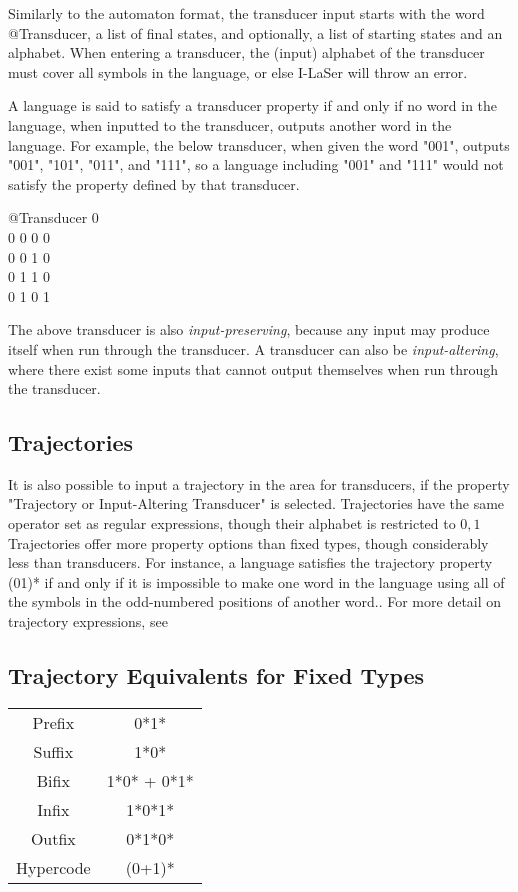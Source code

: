 \documentclass{article}
\begin{document}
Similarly to the automaton format, the transducer input starts with the word @Transducer, a list of final states, and optionally, a list of starting states and an alphabet.
When entering a transducer, the (input) alphabet of the transducer must cover all symbols in the language, or else I-LaSer will throw an error.

A language is said to satisfy a transducer property if and only if no word in the language, when inputted to the transducer, outputs another word in the language. 
For example, the below transducer, when given the word "001", outputs "001", "101", "011", and "111", so a language including "001" and "111" would not satisfy the property defined by that transducer.
\begin{center}
@Transducer 0\\
0 0 0 0\\
0 0 1 0\\
0 1 1 0\\
0 1 0 1\\
\end{center}
The above transducer is also \textit{input-preserving}, because any input may produce itself when run through the transducer. 
A transducer can also be \textit{input-altering}, where there exist some inputs that cannot output themselves when run through the transducer.

\subsection{Trajectories}
It is also possible to input a trajectory in the area for transducers, if the property "Trajectory or Input-Altering Transducer" is selected.
Trajectories have the same operator set as regular expressions, %
though their alphabet is restricted to ${0, 1}$
Trajectories offer more property options than fixed types, though considerably less than transducers.
For instance, a language satisfies the trajectory property (01)* if and only if it is impossible to make one word in the language using all of the symbols in the odd-numbered positions of another word..
For more detail on trajectory expressions, see %

\subsection{Trajectory Equivalents for Fixed Types}
\begin{center}
\begin{tabular}{c c}
Prefix & 0*1*\\
Suffix & 1*0*\\
Bifix & 1*0* + 0*1*\\
Infix & 1*0*1*\\
Outfix & 0*1*0*\\
Hypercode & (0+1)*
\end{tabular}
\end{center}
\end{document}
